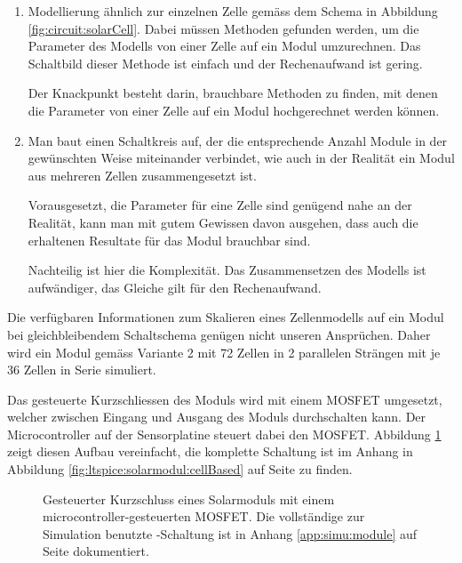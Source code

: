 \begin{enumerate}
    \item
        Modellierung  \"ahnlich  zur  einzelnen   Zelle  gem\"ass  dem  Schema
        in  Abbildung   \ref{fig:circuit:solarCell}. Dabei  m\"ussen  Methoden
        gefunden werden, um die Parameter des  Modells von einer Zelle auf ein
        Modul umzurechnen.  Das Schaltbild dieser  Methode ist einfach und der
        Rechenaufwand ist gering.

        Der Knackpunkt besteht darin, brauchbare Methoden zu finden, mit denen
        die  Parameter von  einer  Zelle auf  ein  Modul hochgerechnet  werden
        k\"onnen.
    \item
        Man baut einen Schaltkreis auf, der die entsprechende Anzahl Module in
        der  gew\"unschten  Weise  miteinander  verbindet,  wie  auch  in  der
        Realit\"at ein Modul aus mehreren Zellen zusammengesetzt ist.

        Vorausgesetzt, die Parameter f\"ur eine  Zelle sind gen\"ugend nahe an
        der Realit\"at, kann man mit  gutem Gewissen davon ausgehen, dass auch
        die erhaltenen Resultate f\"ur das Modul brauchbar sind.

        Nachteilig ist hier die  Komplexit\"at. Das Zusammensetzen des Modells
        ist aufw\"andiger, das Gleiche gilt f\"ur den Rechenaufwand.
\end{enumerate}

Die  verf\"ugbaren   Informationen  zum  Skalieren  eines   Zellenmodells  auf
ein   Modul  bei   gleichbleibendem  Schaltschema   gen\"ugen  nicht   unseren
Anspr\"uchen. Daher wird  ein Modul  gem\"ass Variante  2 mit  72 Zellen  in 2
parallelen Str\"angen mit je 36  Zellen in Serie simuliert.

Das  gesteuerte Kurzschliessen  des Moduls  wird mit  einem MOSFET  umgesetzt,
welcher  zwischen  Eingang  und  Ausgang des  Moduls  durchschalten  kann. Der
Microcontroller  auf der  Sensorplatine  steuert  dabei den  MOSFET. Abbildung
\ref{fig:module:mosfet:simple} zeigt diesen  Aufbau vereinfacht, die komplette
Schaltung  ist im  Anhang in  Abbildung \ref{fig:ltspice:solarmodul:cellBased}
auf Seite \pageref{fig:ltspice:solarmodul:cellBased} zu finden.

\begin{figure}[h!tb]
    \centering
    
    \caption{%
        Gesteuerter     Kurzschluss     eines    Solarmoduls     mit     einem
        microcontroller-gesteuerten MOSFET. Die  vollst\"andige zur Simulation
        benutzte -Schaltung ist  in Anhang \ref{app:simu:module}
        auf Seite \pageref{fig:ltspice:solarmodul:cellBased} dokumentiert.%
    }
    \label{fig:module:mosfet:simple}
\end{figure}


